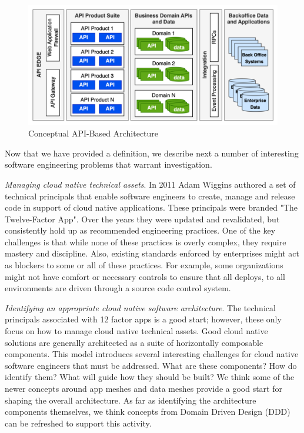 \documentclass[conference]{IEEEtran}
\begin{document}
\begin{figure}[t]
	\includegraphics[width=\textwidth]{images/APIArchitecture.pdf}	
	\caption{Conceptual API-Based Architecture}
	\label{fig:APIArchitecture}
\end{figure}
Now that we have provided a definition, we describe next a number of interesting software engineering problems that warrant investigation.

\textit{Managing cloud native technical assets}.  In 2011 Adam Wiggins authored a set of technical principals that enable software engineers to create, manage and release code in support of cloud native applications. These principals were branded "The Twelve-Factor App"\cite{12factor}.  Over the years they were updated and revalidated\cite{hoffman2016beyond, 12factorRevisited}, but consistently hold up as recommended engineering practices. One of the key challenges is that while none of these practices is overly complex, they require mastery and discipline. Also, existing standards enforced by enterprises might act as blockers to some or all of these practices.  For example, some organizations might not have comfort or necessary controls to ensure that all deploys, to all environments are driven through a source code control system.

\textit{Identifying an appropriate cloud native software architecture}.  The technical principals associated with 12 factor apps is a good start; however, these only focus on how to manage cloud native technical assets.  Good cloud native solutions are generally architected as a suite of horizontally composable components. This model introduces several interesting challenges for cloud native software engineers that must be addressed. What are these components? How do identify them? What will guide how they should be built? We think some of the newer concepts around app meshes\cite{GartnerMASA} and data meshes\cite{datamesh} provide a good start for shaping the overall architecture.  As far as identifying the architecture components themselves, we think concepts from Domain Driven Design (DDD)\cite{evans2004domain, vernon2013implementing} can be refreshed to support this activity.
\end{document}
